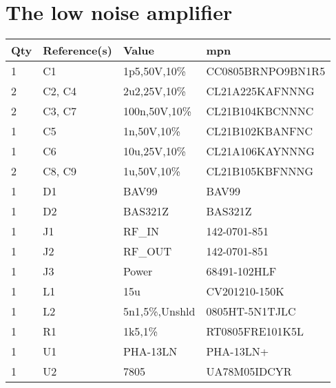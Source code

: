 \section{The low noise amplifier}
\begin{center}
    \begin{tabular}[c]{@{} llll @{}}
        \toprule
        Qty & Reference(s) & Value          & \acrshort{mpn}    \\
        \midrule
        1   & C1           & 1p5,50V,10\%   & CC0805BRNPO9BN1R5 \\
        2   & C2, C4       & 2u2,25V,10\%   & CL21A225KAFNNNG   \\
        2   & C3, C7       & 100n,50V,10\%  & CL21B104KBCNNNC   \\
        1   & C5           & 1n,50V,10\%    & CL21B102KBANFNC   \\
        1   & C6           & 10u,25V,10\%   & CL21A106KAYNNNG   \\
        2   & C8, C9       & 1u,50V,10\%    & CL21B105KBFNNNG   \\
        1   & D1           & BAV99          & BAV99             \\
        1   & D2           & BAS321Z        & BAS321Z           \\
        1   & J1           & RF\_IN         & 142-0701-851      \\
        1   & J2           & RF\_OUT        & 142-0701-851      \\
        1   & J3           & Power          & 68491-102HLF      \\
        1   & L1           & 15u            & CV201210-150K     \\
        1   & L2           & 5n1,5\%,Unshld & 0805HT-5N1TJLC    \\
        1   & R1           & 1k5,1\%        & RT0805FRE101K5L   \\
        1   & U1           & PHA-13LN       & PHA-13LN+         \\
        1   & U2           & 7805           & UA78M05IDCYR      \\
        \bottomrule
    \end{tabular}
\end{center}

\newpage

